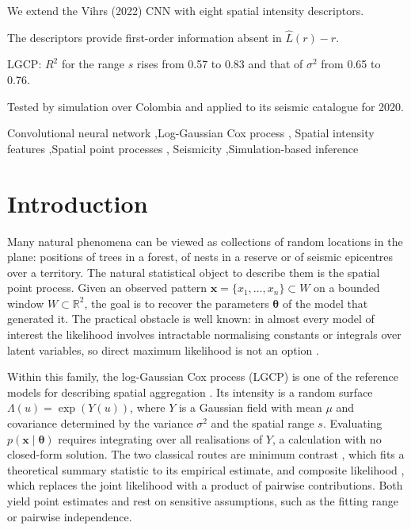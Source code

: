 \documentclass[a4paper,fleqn]{cas-sc}
\numberwithin{equation}{section}
\begin{document}
\begin{highlights}
\item We extend the Vihrs (2022) CNN with eight spatial intensity descriptors.
\item The descriptors provide first-order information absent in $\hat{L}(r)-r$.
\item LGCP: $R^2$ for the range $s$ rises from 0.57 to 0.83 and that of $\sigma^2$ from 0.65 to 0.76.
\item Tested by simulation over Colombia and applied to its seismic catalogue for 2020.
\end{highlights}

\begin{keywords}
Convolutional neural network \sep Log-Gaussian Cox process \sep
Spatial intensity features \sep Spatial point processes \sep
Seismicity \sep Simulation-based inference
\end{keywords}

\maketitle

\section{Introduction}
\label{sec:intro}

Many natural phenomena can be viewed as collections of random locations
in the plane: positions of trees in a forest, of nests in a reserve or
of seismic epicentres over a territory. The natural statistical object
to describe them is the spatial point process. Given an observed
pattern $\mathbf{x}=\{x_1,\ldots,x_n\}\subset W$ on a bounded window
$W\subset\mathbb{R}^2$, the goal is to recover the parameters
$\boldsymbol{\theta}$ of the model that generated it. The practical
obstacle is well known: in almost every model of interest the
likelihood involves intractable normalising constants or integrals over
latent variables, so direct maximum likelihood is not an option
\citep{MollerWaagepetersen2004}.

Within this family, the log-Gaussian Cox process (LGCP) is one of the
reference models for describing spatial aggregation \citep{Moller1998}.
Its intensity is a random surface $\Lambda(u)=\exp(Y(u))$, where $Y$ is
a Gaussian field with mean $\mu$ and covariance determined by the
variance $\sigma^2$ and the spatial range $s$. Evaluating
$p(\mathbf{x}\mid\boldsymbol{\theta})$ requires integrating over all
realisations of $Y$, a calculation with no closed-form solution. The
two classical routes are minimum contrast \citep{mincon83, mincon84},
which fits a theoretical summary statistic to its empirical estimate,
and composite likelihood \citep{complik}, which replaces the joint
likelihood with a product of pairwise contributions. Both yield point
estimates and rest on sensitive assumptions, such as the fitting range
or pairwise independence.
\end{document}
